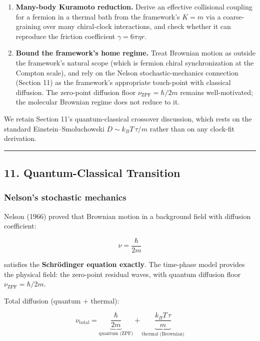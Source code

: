\documentclass[
]{article}
\providecommand{\tightlist}{%
  \setlength{\itemsep}{0pt}\setlength{\parskip}{0pt}}
\begin{document}
\begin{enumerate}
\def\labelenumi{\arabic{enumi}.}
\tightlist
\item
  \textbf{Many-body Kuramoto reduction.} Derive an effective collisional
  coupling for a fermion in a thermal bath from the framework's
  \(K = m\) via a coarse-graining over many chiral-clock interactions,
  and check whether it can reproduce the friction coefficient
  \(\gamma = 6\pi\eta r\).
\item
  \textbf{Bound the framework's home regime.} Treat Brownian motion as
  outside the framework's natural scope (which is fermion chiral
  synchronization at the Compton scale), and rely on the Nelson
  stochastic-mechanics connection (Section 11) as the framework's
  appropriate touch-point with classical diffusion. The zero-point
  diffusion floor \(\nu_{\text{ZPF}} = \hbar/2m\) remains
  well-motivated; the molecular Brownian regime does not reduce to it.
\end{enumerate}

We retain Section 11's quantum-classical crossover discussion, which
rests on the standard Einstein--Smoluchowski \(D \sim k_B T\,\tau/m\)
rather than on any clock-fit derivation.

\begin{center}\rule{0.5\linewidth}{0.5pt}\end{center}

\subsection{11. Quantum-Classical
Transition}\label{quantum-classical-transition}

\subsubsection{Nelson's stochastic
mechanics}\label{nelsons-stochastic-mechanics}

Nelson (1966) proved that Brownian motion in a background field with
diffusion coefficient:

\[\nu = \frac{\hbar}{2m}\]

satisfies the \textbf{Schrödinger equation exactly}. The time-phase
model provides the physical field: the zero-point residual waves, with
quantum diffusion floor \(\nu_{\text{ZPF}} = \hbar/2m\).

Total diffusion (quantum + thermal):

\[\nu_{\text{total}} = \underbrace{\frac{\hbar}{2m}}_{\text{quantum (ZPF)}} + \underbrace{\frac{k_B T\,\tau}{m}}_{\text{thermal (Brownian)}}\]
\end{document}
